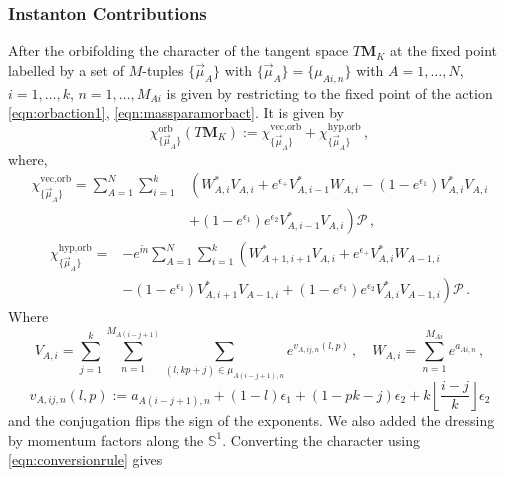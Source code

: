 \documentclass[main.tex]{subfiles}
\begin{document}
\subsubsection{Instanton Contributions}\label{sec:s1s4surfinst}
After the orbifolding the character of the tangent space $T\mathbf{M}_K$ at the fixed point labelled by a set of $M$-tuples $\{\vec{\mu}_{A}\}$ with $\{\vec{\mu}_{A}\}=\{\mu_{Ai,n}\}$ with $A=1,\dots,N$, $i=1,\dots,k$, $n=1,\dots, M_{Ai}$ is given by restricting to the fixed point of the action
\eqref{eqn:orbaction1}, \eqref{eqn:massparamorbact}. It is given by
\begin{equation}\label{eqn:indorb}
\chi^{\text{orb}}_{\{\vec{\mu}_A\}}\left(T\mathbf{M}_K\right):=\chi_{\{\vec{\mu}_A\}}^{\text{vec},\text{orb}}+\chi_{\{\vec{\mu}_A\}}^{\text{hyp},\text{orb}}\,,
\end{equation}
where,
\begin{equation}
\begin{aligned}\chi_{\{\vec{\mu}_A\}}^{\text{vec},\text{orb}}=\sum_{A=1}^N\sum_{i=1}^k&\left(W_{A,i}^*V_{A,i}+e^{\epsilon_+}V_{A,i-1}^*W_{A,i}-(1-e^{\epsilon_1})V_{A,i}^*V_{A,i}\right.\\
&\left.+(1-e^{\epsilon_1})e^{\epsilon_2}V_{A,i-1}^*V_{A,i}\right)\mathcal{P}\,,
\end{aligned}
\end{equation}
\begin{equation}
\begin{aligned}
\chi_{\{\vec{\mu}_A\}}^{\text{hyp},\text{orb}}=&-e^{\tilde{m}}\sum_{A=1}^N\sum_{i=1}^k\left(W_{A+1,i+1}^*V_{A,i}+e^{\epsilon_+}V_{A,i}^*W_{A-1,i}\right.\\
&\left.-(1-e^{\epsilon_1})V_{A,i+1}^*V_{A-1,i}+(1-e^{\epsilon_1})e^{\epsilon_2}V_{A,i}^*V_{A-1,i}\right)\mathcal{P}\,.\end{aligned}
\end{equation}
Where
\begin{equation}
V_{A,i}=\sum_{j=1}^k\sum_{n=1}^{M_{A(i-j+1)}}\sum_{(l,kp+j)\in\mu_{A(i-j+1),n}}e^{v_{A,ij,n}(l,p)}\,,\quad W_{A,i}=\sum_{n=1}^{M_{Ai}}e^{a_{Ai,n}}\,,\label{eqn:simpleinstform}
\end{equation}
\begin{equation}
v_{A,ij,n}(l,p):=a_{A(i-j+1),n}+(1-l)\epsilon_1+(1-pk-j)\epsilon_2+k\left\lfloor\frac{i-j}{k}\right\rfloor\epsilon_2
\end{equation}
and the conjugation flips the sign of the exponents. We also added the dressing by momentum factors along the $\mathbb{S}^1$. Converting the character using \eqref{eqn:conversionrule} gives
\end{document}
